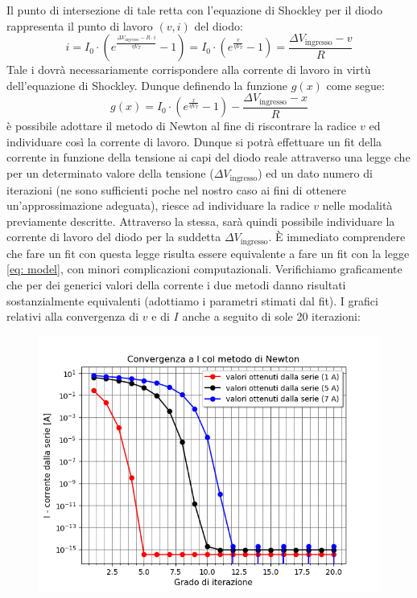 \documentclass{article}[a4paper, oneside, 11pt]
\begin{document}
Il punto di intersezione di tale retta con l’equazione di Shockley per il 
diodo rappresenta il punto di lavoro $(v, i)$ del diodo:
\begin{equation}
i = I_0 \cdot ( e^{\frac {\Delta V_{\text{ingresso}} - R \cdot i}{\eta V_T} } - 
1) = I_0 \cdot (e^{\frac{v} {\eta V_T}} -1) =  \frac{\Delta V_{\text{ingresso}} 
- v}{R}
\end{equation}
Tale i dovrà necessariamente corrispondere alla corrente di lavoro in virtù 
dell’equazione di Shockley. Dunque definendo la funzione $g(x)$ come segue:
\begin{equation}\label{eq: invsck}
g(x) = I_0 \cdot ( e^{\frac{x}{\eta V_T}} - 1)  - \frac {\Delta 
V_{\text{ingresso}} - x}{R}
\end{equation}
è possibile adottare il metodo di Newton al fine di riscontrare la radice $v$
ed individuare così la corrente di lavoro. 
Dunque si potrà effettuare un fit della corrente in funzione della tensione ai 
capi del diodo reale attraverso una legge che per un determinato valore della 
tensione ($\Delta V_{\text{ingresso}}$) ed un dato numero di iterazioni (ne 
sono sufficienti poche nel nostro caso ai fini di ottenere un’approssimazione 
adeguata), riesce ad individuare la radice $v$ nelle modalità previamente 
descritte. Attraverso la stessa, sarà quindi possibile individuare la corrente 
di lavoro del diodo per la suddetta $\Delta V_{\text{ingresso}}$. 
\`E immediato comprendere che fare un fit con questa legge risulta essere 
equivalente a fare un fit con la legge \eqref{eq: model}, con minori complicazioni 
computazionali. Verifichiamo graficamente che per dei generici valori della 
corrente  i due metodi danno risultati sostanzialmente equivalenti (adottiamo i 
parametri stimati dal fit). I grafici relativi alla convergenza di $v$ e di $I$ 
anche a seguito di sole 20 iterazioni:
\begin{figure}[H]%
	\centering 
 		\includegraphics[scale=0.75]{./Figura2_appendiceB.png}
\end{figure}
\end{document}
